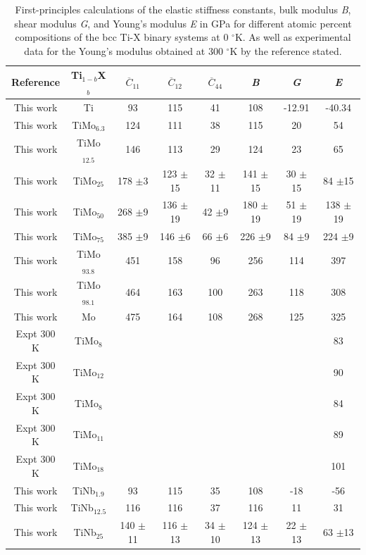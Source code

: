 \newpage
\begin{longtable}[H]{ c c c c c c c c}
	\caption{First-principles calculations of the elastic stiffness constants, bulk modulus \textit{B}, shear modulus \textit{G}, and Young's modulus \textit{E} in GPa for different atomic percent compositions of the bcc Ti-X binary systems at 0 $^\circ$K. As well as experimental data for the Young's modulus obtained at 300 $^\circ$K by the reference stated.} 	\label{Ch5-table:tixelasdata} \\
	\hline
	Reference & Ti$_{1-b}$X$_b$ & $\overline{C}_{11}$ & $\overline{C}_{12}$ & $\overline{C}_{44}$ & \textit{B} & \textit{G} & \textit{E}\\
	\hline
	\endhead
	\hline
	\endfoot
	This work & Ti & 93 & 115 & 41 & 108 & -12.91 & -40.34\\
	This work & TiMo$_{6.3}$ & 124 & 111 & 38 & 115 & 20 & 54\\
	This work & TiMo$_{12.5}$ & 146 & 113 & 29 & 124 & 23 & 65\\
	This work & TiMo$_{25}$ & 178 $\pm$3 & 123 $\pm$15 & 32 $\pm$11 & 141 $\pm$15 & 30 $\pm$15 & 84 $\pm$15\\
	This work & TiMo$_{50}$ & 268 $\pm$9 & 136 $\pm$19 & 42 $\pm$9 & 180 $\pm$19 & 51 $\pm$19 & 138 $\pm$19\\
	This work & TiMo$_{75}$ & 385 $\pm$9 & 146 $\pm$6 & 66 $\pm$6 & 226 $\pm$9 & 84 $\pm$9 & 224 $\pm$9\\
	This work & TiMo$_{93.8}$ & 451 & 158 & 96 & 256 & 114 & 397\\
	This work & TiMo$_{98.1}$ & 464 & 163 & 100 & 263 & 118 & 308\\
	This work & Mo & 475 & 164 & 108 & 268 & 125 & 325\\
	Expt 300 K \cite{Zhang2015} & TiMo$_8$ & & & & & & 83\\
	Expt 300 K \cite{Zhang2015} & TiMo$_{12}$ & & & & & & 90\\
	Expt 300 K \cite{Boyer1994} & TiMo$_{8}$ & & & & & & 84\\
	Expt 300 K \cite{Boyer1994} & TiMo$_{11}$ & & & & & & 89\\
	Expt 300 K \cite{Boyer1994} & TiMo$_{18}$ & & & & & & 101\\
	This work & TiNb$_{1.9}$ & 93 & 115 & 35 & 108 & -18 & -56\\
	This work & TiNb$_{12.5}$ & 116 & 116 & 37 & 116 & 11 & 31\\
	This work & TiNb$_{25}$ & 140 $\pm$11 & 116 $\pm$13 & 34 $\pm$10 & 124 $\pm$13 & 22 $\pm$13 & 63 $\pm$13\\

\end{longtable}
